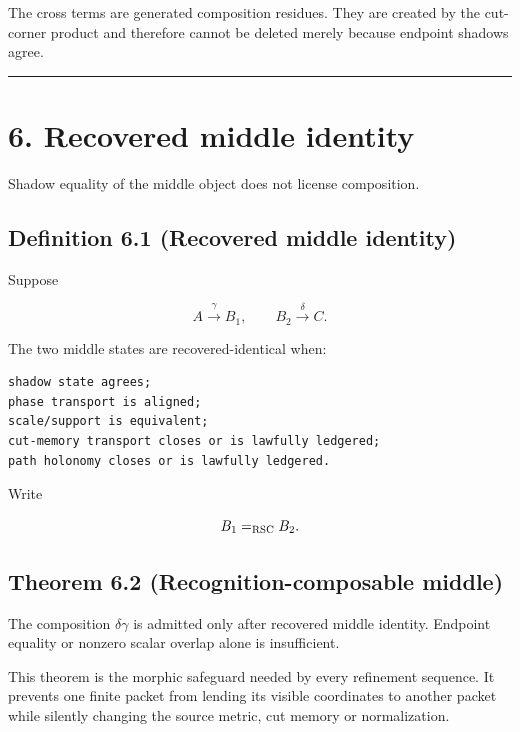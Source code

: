 The cross terms are generated composition residues. They are created by the
cut-corner product and therefore cannot be deleted merely because endpoint
shadows agree.

\begin{center}\rule{0.5\linewidth}{0.5pt}\end{center}

\hypertarget{recovered-middle-identity}{%
\section{6. Recovered middle identity}\label{recovered-middle-identity}}

Shadow equality of the middle object does not license composition.

\hypertarget{definition-6.1-recovered-middle-identity}{%
\subsection{Definition 6.1 (Recovered middle identity)}\label{definition-6.1-recovered-middle-identity}}

Suppose

\[
A\xrightarrow{\gamma}B_1,
\qquad
B_2\xrightarrow{\delta}C.
\]

The two middle states are recovered-identical when:

\begin{verbatim}
shadow state agrees;
phase transport is aligned;
scale/support is equivalent;
cut-memory transport closes or is lawfully ledgered;
path holonomy closes or is lawfully ledgered.
\end{verbatim}

Write

\[
B_1=_{\mathrm{RSC}}B_2.
\]

\hypertarget{theorem-6.2-recognition-composable-middle}{%
\subsection{Theorem 6.2 (Recognition-composable middle)}\label{theorem-6.2-recognition-composable-middle}}

The composition \(\delta\gamma\) is admitted only after recovered middle
identity. Endpoint equality or nonzero scalar overlap alone is insufficient.

This theorem is the morphic safeguard needed by every refinement sequence. It
prevents one finite packet from lending its visible coordinates to another
packet while silently changing the source metric, cut memory or normalization.

